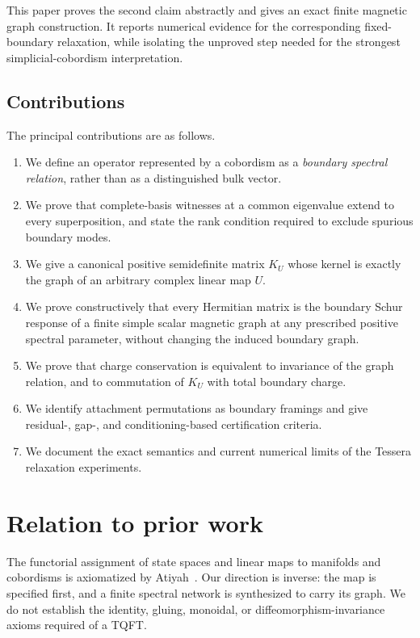 \documentclass[11pt]{article}
\numberwithin{equation}{section}
\theoremstyle{definition}
\theoremstyle{remark}
\begin{document}
This paper proves the second claim abstractly and gives an exact finite magnetic
graph construction.  It reports numerical evidence for the corresponding
fixed-boundary relaxation, while isolating the unproved step needed for the
strongest simplicial-cobordism interpretation.

\subsection{Contributions}

The principal contributions are as follows.

\begin{enumerate}[leftmargin=2.2em]
  \item We define an operator represented by a cobordism as a \emph{boundary
  spectral relation}, rather than as a distinguished bulk vector.
  \item We prove that complete-basis witnesses at a common eigenvalue extend to
  every superposition, and state the rank condition required to exclude
  spurious boundary modes.
  \item We give a canonical positive semidefinite matrix $K_U$ whose kernel is
  exactly the graph of an arbitrary complex linear map $U$.
  \item We prove constructively that every Hermitian matrix is the boundary
  Schur response of a finite simple scalar magnetic graph at any prescribed
  positive spectral parameter, without changing the induced boundary graph.
  \item We prove that charge conservation is equivalent to invariance of the
  graph relation, and to commutation of $K_U$ with total boundary charge.
  \item We identify attachment permutations as boundary framings and give
  residual-, gap-, and conditioning-based certification criteria.
  \item We document the exact semantics and current numerical limits of the
  Tessera relaxation experiments.
\end{enumerate}

\section{Relation to prior work}

The functorial assignment of state spaces and linear maps to manifolds and
cobordisms is axiomatized by Atiyah~\cite{atiyah1988}.  Our direction is inverse:
the map is specified first, and a finite spectral network is synthesized to
carry its graph.  We do not establish the identity, gluing, monoidal, or
diffeomorphism-invariance axioms required of a TQFT.
\end{document}
